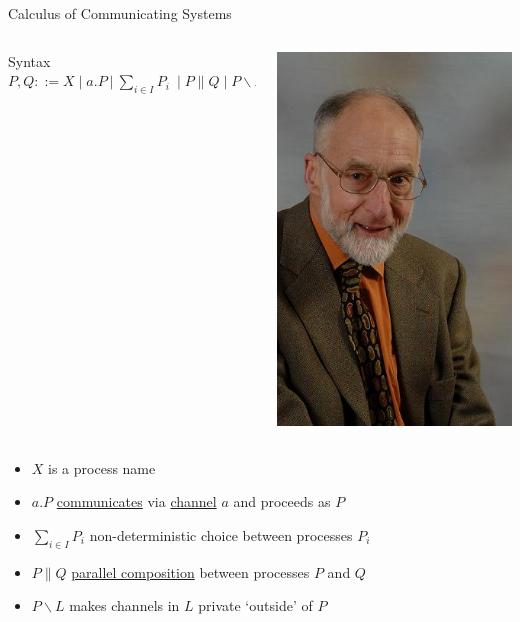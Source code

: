 \documentclass{beamer}
\begin{document}
\begin{frame}{Calculus of Communicating Systems}

  \begin{minipage}[0.3\textheight]{\textwidth}
  \begin{columns}[c]
  \begin{column}{0.8\textwidth}
    \begin{block}{Syntax}
      $P,Q ::= X \mid a . P\ |\ \sum_{ i \in I} P_i \ \mid P \parallel Q 
      \mid P \backslash L \mid \dots$
    \end{block}
  \end{column}
  \begin{column}{0.23\textwidth}
    \includegraphics[scale=0.25]{images/Milner.jpg}
  \end{column}
  \end{columns}
  \end{minipage}
  \begin{itemize}
  \item $X$ is a process name
  \item $a. P$ \underline{communicates} via \underline{channel} $a$ and proceeds as $P$
  \item $\sum_{ i \in I} P_i$ non-deterministic choice between processes $P_i$
  \item $P \parallel Q$ \underline{parallel composition} 
          between processes $P$ and $Q$
  \item $P \backslash L$ makes channels in $L$ private `outside' of $P$
  \end{itemize}
\end{frame}
\end{document}

